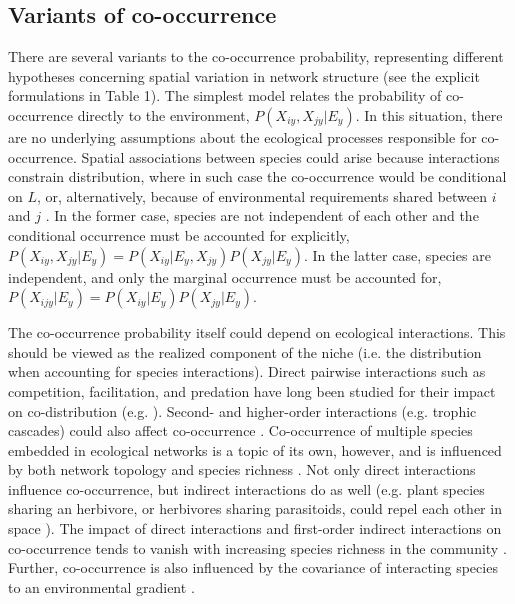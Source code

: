 \documentclass[12pt]{article}
\begin{document}
\subsection*{Variants of co-occurrence}

There are several variants to the co-occurrence probability, representing
different hypotheses concerning spatial variation in network structure (see
the explicit formulations in Table 1). The simplest model relates the
probability of co-occurrence directly to the environment,
$P(X_{iy},X_{jy}|E_y)$. In this situation, there are no underlying assumptions
about the ecological processes responsible for co-occurrence. Spatial associations between species could arise
because interactions constrain distribution, where in such case the co-occurrence would be conditional on $L$, or, alternatively, because of
environmental requirements shared between $i$ and $j$ \citep{Pollock2014,
Cazelles2016}. In the former case, species are not independent of each other
and the conditional occurrence must be accounted for explicitly,
$P(X_{iy},X_{jy} |E_y)=P(X_{iy}|E_y,X_{jy})P(X_{jy}|E_y)$. In the latter case,
species are independent, and only the marginal occurrence must be accounted
for, $P( X_{ijy}|E_y)=P(X_{iy} |E_y)P(X_{jy} |E_y)$.

The co-occurrence probability itself could depend on ecological interactions. 
This should be viewed as the realized component of the niche (i.e. the
distribution when accounting for species interactions). Direct pairwise
interactions such as competition, facilitation, and predation have long been
studied for their impact on co-distribution (e.g. \citealt{Diamond1975,
Connor1979, Gotelli2000}). Second- and higher-order interactions (e.g. trophic
cascades) could also affect co-occurrence \citep{Harris2016,
Staniczenko2017}. Co-occurrence of multiple species embedded in ecological
networks is a topic of its own, however, and is influenced by both network
topology and species richness \citep{Cazelles2016}. Not only direct
interactions influence co-occurrence, but indirect interactions do as well
(e.g. plant species sharing an herbivore, or herbivores sharing parasitoids,
could repel each other in space \citep{Holt1993}). The impact of direct
interactions and first-order indirect interactions on co-occurrence tends to
vanish with increasing species richness in the community \citep{Cazelles2016}.
Further, co-occurrence is also influenced by the covariance of interacting
species to an environmental gradient \citep{Cazelles2015}. 
\end{document}
